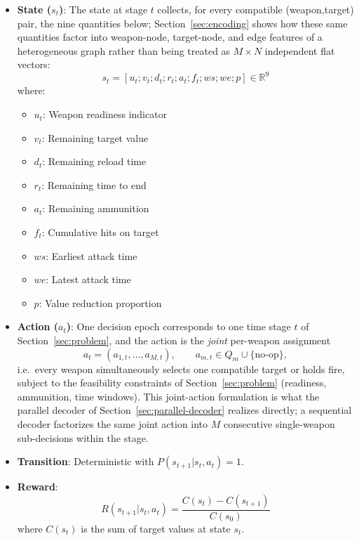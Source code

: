 \begin{itemize}
\item \textbf{State ($s_t$)}: The state at stage $t$ collects, for every compatible (weapon,target) pair, the nine quantities below; Section~\ref{sec:encoding} shows how these same quantities factor into weapon-node, target-node, and edge features of a heterogeneous graph rather than being treated as $M \times N$ independent flat vectors:
\begin{equation}
\label{eq:state}
s_t = [u_t; v_t; d_t; r_t; a_t; f_t; ws; we; p] \in \mathbb{R}^9
\end{equation}
where:
\begin{itemize}
    \item $u_t$: Weapon readiness indicator
    \item $v_t$: Remaining target value
    \item $d_t$: Remaining reload time
    \item $r_t$: Remaining time to end
    \item $a_t$: Remaining ammunition
    \item $f_t$: Cumulative hits on target
    \item $ws$: Earliest attack time
    \item $we$: Latest attack time
    \item $p$: Value reduction proportion
\end{itemize}

\item \textbf{Action ($a_t$)}: One decision epoch corresponds to one time stage $t$ of Section~\ref{sec:problem}, and the action is the \emph{joint} per-weapon assignment
\begin{equation}
    a_t = (a_{1,t}, \ldots, a_{M,t}), \qquad a_{m,t} \in Q_m \cup \{\text{no-op}\},
\end{equation}
i.e.\ every weapon simultaneously selects one compatible target or holds fire, subject to the feasibility constraints of Section~\ref{sec:problem} (readiness, ammunition, time windows). This joint-action formulation is what the parallel decoder of Section~\ref{sec:parallel-decoder} realizes directly; a sequential decoder factorizes the same joint action into $M$ consecutive single-weapon sub-decisions within the stage.

\item \textbf{Transition}: Deterministic with $P(s_{t+1} | s_t, a_t) = 1$.

\item \textbf{Reward}:
\begin{equation}
\label{eq:reward}
    R(s_{t+1} | s_t, a_t) = \frac{C(s_t) - C(s_{t+1})}{C(s_{0})}
\end{equation}
where $C(s_t)$ is the sum of target values at state $s_t$.
\end{itemize}

